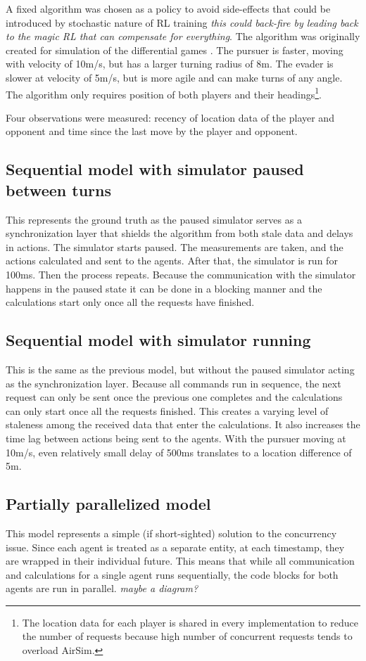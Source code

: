 \documentclass{article}
\begin{document}
A fixed algorithm was chosen as a policy to avoid side-effects that could be introduced by stochastic nature of RL training \emph{this could back-fire by leading back to the magic RL that can compensate for everything}. The algorithm was originally created for simulation of the differential games \cite{anne-paper}. The pursuer is faster, moving with velocity of 10m/s, but has a larger turning radius of 8m. The evader is slower at velocity of 5m/s, but is more agile and can make turns of any angle. The algorithm only requires position of both players and their headings\footnote{The location data for each player is shared in every implementation to reduce the number of requests because high number of concurrent requests tends to overload AirSim.}. 

Four observations were measured: recency of location data of the player and opponent and time since the last move by the player and opponent.

\subsection{Sequential model with simulator paused between turns}
This represents the ground truth as the paused simulator serves as a synchronization layer that shields the algorithm from both stale data and delays in actions. The simulator starts paused. The measurements are taken, and the actions calculated and sent to the agents. After that, the simulator is run for 100ms. Then the process repeats. Because the communication with the simulator happens in the paused state it can be done in a blocking manner and the calculations start only once all the requests have finished.

\subsection{Sequential model with simulator running}
This is the same as the previous model, but without the paused simulator acting as the synchronization layer. Because all commands run in sequence, the next request can only be sent once the previous one completes and the calculations can only start once all the requests finished. This creates a varying level of staleness among the received data that enter the calculations. It also increases the time lag between actions being sent to the agents. With the pursuer moving at 10m/s, even relatively small delay of 500ms translates to a location difference of 5m.

\subsection{Partially parallelized model}
This model represents a simple (if short-sighted) solution to the concurrency issue. Since each agent is treated as a separate entity, at each timestamp, they are wrapped in their individual future. This means that while all communication and calculations for a single agent runs sequentially, the code blocks for both agents are run in parallel. \emph{maybe a diagram?}
\end{document}
